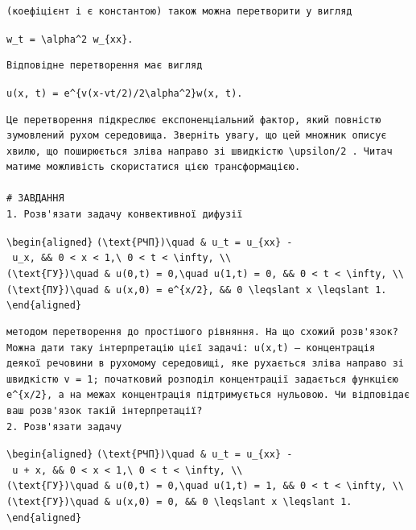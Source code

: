 \documentclass[
  ukrainian,
]{article}
\begin{document}
\begin{verbatim}
(коефіцієнт і є константою) також можна перетворити у вигляд
\end{verbatim}

\texttt{w\_t\ =\ \textbackslash{}alpha\^{}2\ w\_\{xx\}.}

\begin{verbatim}
Відповідне перетворення має вигляд
\end{verbatim}

\texttt{u(x,\ t)\ =\ e\^{}\{v(x-vt/2)/2\textbackslash{}alpha\^{}2\}w(x,\ t).}

\begin{verbatim}
Це перетворення підкреслює експоненціальний фактор, який повністю зумовлений рухом середовища. Зверніть увагу, що цей множник описує хвилю, що поширюється зліва направо зі швидкістю \upsilon/2 . Читач матиме можливість скористатися цією трансформацією.

# ЗАВДАННЯ
1. Розв'язати задачу конвективної дифузії
\end{verbatim}

\texttt{\textbackslash{}begin\{aligned\}}
\texttt{(\textbackslash{}text\{РЧП\})\textbackslash{}quad\ \&\ u\_t\ =\ u\_\{xx\}\ -\ u\_x,\ \&\&\ 0\ \textless{}\ x\ \textless{}\ 1,\textbackslash{}\ 0\ \textless{}\ t\ \textless{}\ \textbackslash{}infty,\ \textbackslash{}\textbackslash{}}
\texttt{(\textbackslash{}text\{ГУ\})\textbackslash{}quad\ \&\ u(0,t)\ =\ 0,\textbackslash{}quad\ u(1,t)\ =\ 0,\ \&\&\ 0\ \textless{}\ t\ \textless{}\ \textbackslash{}infty,\ \textbackslash{}\textbackslash{}}
\texttt{(\textbackslash{}text\{ПУ\})\textbackslash{}quad\ \&\ u(x,0)\ =\ e\^{}\{x/2\},\ \&\&\ 0\ \textbackslash{}leqslant\ x\ \textbackslash{}leqslant\ 1.}
\texttt{\textbackslash{}end\{aligned\}}

\begin{verbatim}
методом перетворення до простішого рівняння. На що схожий розв'язок? Можна дати таку інтерпретацію цієї задачі: u(x,t) — концентрація деякої речовини в рухомому середовищі, яке рухається зліва направо зі швидкістю v = 1; початковий розподіл концентрації задається функцією e^{x/2}, а на межах концентрація підтримується нульовою. Чи відповідає ваш розв'язок такій інтерпретації?
2. Розв'язати задачу
\end{verbatim}

\texttt{\textbackslash{}begin\{aligned\}}
\texttt{(\textbackslash{}text\{РЧП\})\textbackslash{}quad\ \&\ u\_t\ =\ u\_\{xx\}\ -\ u\ +\ x,\ \&\&\ 0\ \textless{}\ x\ \textless{}\ 1,\textbackslash{}\ 0\ \textless{}\ t\ \textless{}\ \textbackslash{}infty,\ \textbackslash{}\textbackslash{}}
\texttt{(\textbackslash{}text\{ГУ\})\textbackslash{}quad\ \&\ u(0,t)\ =\ 0,\textbackslash{}quad\ u(1,t)\ =\ 1,\ \&\&\ 0\ \textless{}\ t\ \textless{}\ \textbackslash{}infty,\ \textbackslash{}\textbackslash{}}
\texttt{(\textbackslash{}text\{ГУ\})\textbackslash{}quad\ \&\ u(x,0)\ =\ 0,\ \&\&\ 0\ \textbackslash{}leqslant\ x\ \textbackslash{}leqslant\ 1.}
\texttt{\textbackslash{}end\{aligned\}}
\end{document}
